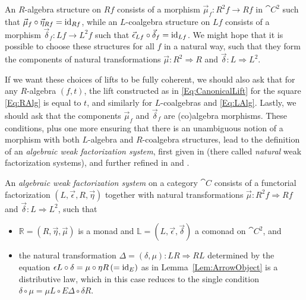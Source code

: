 An $R$-algebra structure on $Rf$ consists of a morphism $\vec{\mu}_f\colon R^2f\to Rf$ in $\cat{C}^2$ such that $\vec{\mu}_f\circ\vec{\eta}_{Rf}=\operatorname{id}_{Rf}$, while an $L$-coalgebra structure on $Lf$ consists of a morphism $\vec{\delta}_f\colon Lf\to L^2f$ such that $\vec{\epsilon}_{Lf}\circ\vec{\delta}_f=\operatorname{id}_{Lf}$. We might hope that it is possible to choose these structures for all $f$ in a natural way, such that they form the components of natural transformations $\vec{\mu}\colon R^2\Rightarrow R$ and $\vec{\delta}\colon L\Rightarrow L^2$.

If we want these choices of lifts to be fully coherent, we should also ask that for any $R$-algebra $(f,t)$, the lift constructed as in \eqref{Eq:CanonicalLift} for the square \eqref{Eq:RAlg} is equal to $t$, and similarly for $L$-coalgebras and \eqref{Eq:LAlg}. Lastly, we should ask that the components $\vec{\mu}_f$ and $\vec{\delta}_f$ are (co)algebra morphisms. These conditions, plus one more ensuring that there is an unambiguous notion of a morphism with both $L$-algebra and $R$-coalgebra structures, lead to the definition of an \emph{algebraic weak factorization system}, first given in \cite{gt:nwfs} (there called \emph{natural} weak factorization systems), and further refined in \cite{garner:nwfs} and \cite{garner:soa}.

\begin{definition}\label{Def:Awfs}
	An \emph{algebraic weak factorization system} on a category $\cat{C}$ consists of a functorial factorization $(L,\vec{\epsilon},R,\vec{\eta})$ together with natural transformations $\vec{\mu}\colon R^2f\Rightarrow Rf$ and $\vec{\delta}\colon L\Rightarrow L^2$, such that
	\begin{itemize}
		\item $\mathbb{R}=(R,\vec{\eta},\vec{\mu})$ is a monad and $\mathbb{L}=(L,\vec{\epsilon},\vec{\delta})$ a comonad on $\cat{C}^2$, and
		\item the natural transformation $\Delta=(\delta,\mu)\colon LR\Rightarrow RL$ determined by the equation $\epsilon L\circ\delta=\mu\circ\eta R \, (=\operatorname{id}_E)$ as in Lemma~\ref{Lem:ArrowObject} is a distributive law, which in this case reduces to the single condition $\delta\circ\mu = \mu L\circ E\Delta\circ\delta R$.
	\end{itemize}
\end{definition}
